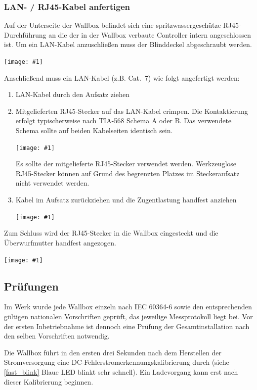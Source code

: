 \documentclass[a4paper,10pt]{article}
\newcommand{\hint}[1]{\begin{tcolorbox}[colback=boxgray,colframe=black,coltext=
white,title=Hinweis,left*=2mm,right*=2mm,boxsep=1mm,bottom=1mm,top=1mm]#1\end{tcolorbox}}
\newcommand{\gfx}[1]{\texttt{[image: \#1]}}
\begin{document}
\begin{multicols*}{2}
	\subsubsection{LAN- / RJ45-Kabel anfertigen}\label{ethernet}

	Auf der Unterseite der Wallbox befindet sich eine spritzwassergeschütze RJ45-Durchführung
	an die der in der Wallbox verbaute Controller intern
	angeschlossen ist. Um ein LAN-Kabel anzuschließen muss der Blinddeckel
	abgeschraubt werden.

	\gfx{./img_warp2/resized/warp2_ethernet3_circle_600} %

	Anschließend muss ein LAN-Kabel (z.B. Cat.~7) wie folgt
	angefertigt werden:

	\begin{enumerate}
		\item LAN-Kabel durch den Aufsatz ziehen
		\item Mitgelieferten RJ45-Stecker auf das LAN-Kabel crimpen. Die
		Kontaktierung erfolgt typischerweise nach TIA-568 Schema A oder B.
		Das verwendete Schema sollte auf beiden Kabelseiten identisch sein.

		\gfx{./img_warp2/resized/warp2_rj45_1_600}
		\hint{Es sollte der mitgelieferte RJ45-Stecker verwendet werden. Werkzeuglose RJ45-Stecker können auf Grund des begrenzten
		Platzes im Steckeraufsatz nicht verwendet werden.}

		\item Kabel im Aufsatz zurückziehen und die Zugentlastung handfest anziehen

		\gfx{./img_warp2/resized/warp2_rj45_2_600}
	\end{enumerate}

	Zum Schluss wird der RJ45-Stecker in die Wallbox eingesteckt und die Überwurfmutter
	handfest angezogen.

	\gfx{./img_warp2/resized/warp2_ethernet4_600} %

	\subsection{Prüfungen}\label{tests}
	Im Werk wurde jede Wallbox einzeln nach IEC 60364-6 sowie den entsprechenden gültigen
	nationalen Vorschriften geprüft, das jeweilige Messprotokoll liegt bei.
	Vor der ersten Inbetriebnahme ist dennoch eine Prüfung der Gesamtinstallation
	nach den selben Vorschriften notwendig.

	Die Wallbox führt in den ersten drei Sekunden nach dem Herstellen der Stromversorgung
	eine DC-Fehlerstromerkennungskalibrierung durch (siehe \ref{fast_blink} Blaue LED blinkt sehr schnell).
	Ein Ladevorgang kann erst nach dieser Kalibrierung beginnen.


\end{multicols*}
\end{document}
